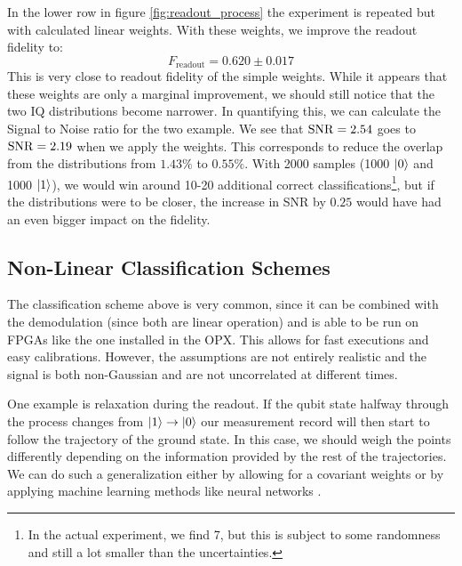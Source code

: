 In the lower row in figure \ref{fig:readout_process} the experiment is repeated but with calculated linear weights. With these weights, we improve the readout fidelity to:
\begin{equation}
    F_{\text{readout}} = 0.620 \pm 0.017
\end{equation}
This is very close to readout fidelity of the simple weights. While it appears that these weights are only a marginal improvement, we should still notice that the two IQ distributions become narrower. In quantifying this, we can calculate the Signal to Noise ratio for the two example. We see that $\operatorname{SNR} = 2.54$ goes to $\operatorname{SNR} = 2.19$ when we apply the weights. This corresponds to reduce the overlap from the distributions from $1.43\%$ to $0.55\%$. With 2000 samples (1000 $\ket{0}$ and 1000 $\ket{1}$), we would win around 10-20 additional correct classifications\footnote{In the actual experiment, we find 7, but this is subject to some randomness and still a lot smaller than the uncertainties.}, but if the distributions were to be closer, the increase in SNR by $0.25$ would have had an even bigger impact on the fidelity.


\subsection{Non-Linear Classification Schemes}
The classification scheme above is very common, since it can be combined with the demodulation (since both are linear operation) and is able to be run on FPGAs like the one installed in the OPX. This allows for fast executions and easy calibrations. However, the assumptions are not entirely realistic and the signal is both non-Gaussian and are not uncorrelated  at different times.

One example is relaxation during the readout. If the qubit state halfway through the process changes from $\ket{1}\to \ket{0}$ our measurement record will then start to follow the trajectory of the ground state. In this case, we should weigh the points differently depending on the information provided by the rest of the trajectories. We can do such a generalization either by allowing for a covariant weights\cite{gambetta_protocols_2007} or by applying machine learning methods like neural networks \cite{lienhard_deep-neural-network_2022}.




